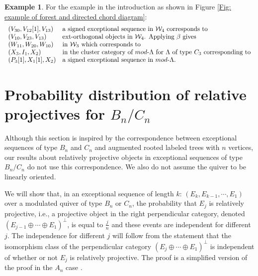 \documentclass[11pt]{amsart}
\theoremstyle{definition}
\newtheorem{eg}[thm]{Example}
\theoremstyle{remark}
\numberwithin{equation}{section}
\newcommand{\cW}{\ensuremath{{\mathcal{W}}}}
\begin{document}
\begin{eg}\label{example in introduction}
For the example in the introduction as shown in Figure \ref{Fig: example of forest and directed chord diagram}:
\[
\begin{array}{ll}
(V_{30},V_{12}[1],V_{13}) & \text{a signed exceptional sequence in $\cW_4$ corresponds to}\\
(V_{10},V_{23},V_{13}) & \text{ext-orthogonal objects in $\cW_4$. Applying $\beta$ gives} \\
(W_{11},W_{20},W_{10}) & \text{in $\cW_3$ which corresponds to}\\
(X_3,I_1,X_2) & \text{in the cluster category of $mod\text-\Lambda$ for $\Lambda$ of type $C_3$ corresponding to}
\\
(P_3[1],X_1[1],X_2) & \text{a signed exceptional sequence in $mod\text-\Lambda$.}
\end{array}
\]
\end{eg}




\section{Probability distribution of relative projectives for $B_n/C_n$}\label{sec: signed exc seq for Cn}


Although this section is inspired by the correspondence between exceptional sequences of type $B_n$ and $C_n$ and augmented rooted labeled trees with $n$ vertices, our results about relatively projective objects in exceptional sequences of type $B_n/C_n$ do not use this correspondence. We also do not assume the quiver to be linearly oriented.

We will show that, in an exceptional sequence of length $k$: $(E_k,E_{k-1},\cdots,E_1)$ over a modulated quiver of type $B_n$ or $C_n$, the probability that $E_j$ is relatively projective, i.e., a projective object in the right perpendicular category, denoted $(E_{j-1}\oplus\cdots\oplus E_1)^\perp$, is equal to $\frac jn$ and these events are independent for different $j$. The independence for different $j$ will follow from the statement that the isomorphism class of the perpendicular category $(E_{j}\oplus\cdots\oplus E_1)^\perp$ is independent of whether or not $E_j$ is relatively projective. The proof is a simplified version of the proof in the $A_n$ case \cite{I:prob}.
\end{document}
